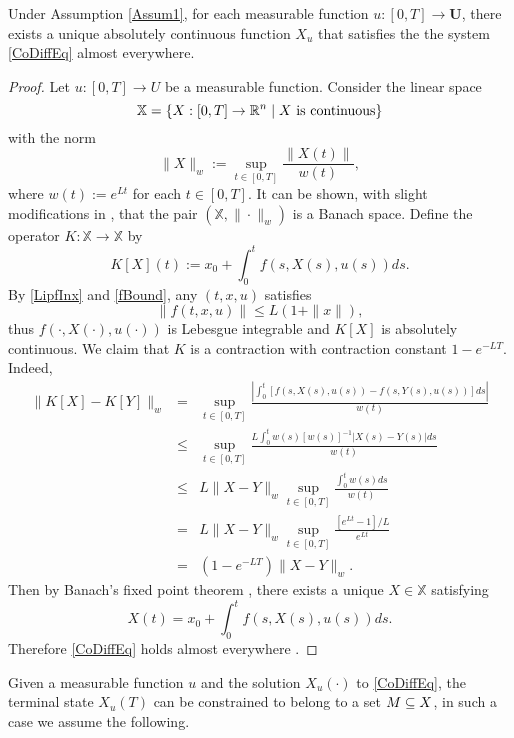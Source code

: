 \begin{theorem}\label{ExAdmisPair} 
	Under Assumption \ref{Assum1}, for each measurable function 
	$u:[0,T]\to \mathbf{U}$, there exists a unique absolutely continuous function $X_u$ that satisfies the the system 
	\eqref{CoDiffEq} almost everywhere. %
\end{theorem}
\begin{proof} Let $u:[0,T]\to U$ be a measurable function. Consider the linear space 
    \[\mathbb{X}=\{X:[0,T]\to \mathbb{R}^n\mid X \mbox{ is continuous}\}\] 
with the norm
    \[ \|X\|_w:=\sup_{t\in[0,T]} \frac{\|X(t)\|}{w(t)}, \]
where $w(t):=e^{Lt}$ for each $t\in [0,T]$. It can be shown, with slight modifications in \cite[Section 2.1]{Teschl}, that the pair $(\mathbb{X},\|\cdot\|_w)$ is a Banach space. Define the operator $K:\mathbb{X}\to \mathbb{X}$ by 
    \[ K[X](t):=x_0 + \int_0^t f(s,X(s),u(s))ds.\]
By \eqref{LipfInx} and \eqref{fBound}, any $(t,x,u)$ satisfies 
  \begin{equation}
      \|f(t,x,u)\| \leq  L(1+\|x\|),
  \end{equation}
thus $f(\cdot,X(\cdot),u(\cdot))$ is Lebesgue integrable and $K[X]$ is absolutely continuous. We claim that $K$ is a contraction with contraction constant $1-e^{-LT}$. Indeed,
    \begin{eqnarray*}
    \| K[X] - K[Y] \|_w & = & \sup_{t\in[0,T]} \frac{|\int_0^t [f(s,X(s),u(s)) -f(s,Y(s),u(s))]ds|}{w(t)}\\
        & \leq &   \sup_{t\in[0,T]} \frac{L\int_0^t w(s)[w(s)]^{-1}|X(s) -Y(s)|ds}{w(t)}\\
        &\leq &  L\|X-Y\|_w \sup_{t\in[0,T]} \frac{\int_0^t w(s)ds}{w(t)}\\
        & = &  L\|X-Y\|_w \sup_{t\in[0,T]}\frac{[e^{Lt}-1]/L}{e^{Lt}}\\
        & = &  (1-e^{-LT})\|X-Y\|_w. 
    \end{eqnarray*}
Then by Banach's fixed point theorem \cite[Theorem 2.1]{Teschl}, there exists a unique $X\in \mathbb{X}$ satisfying 
    \[ X(t)=x_0 + \int_0^t f(s,X(s),u(s))ds.\]
Therefore \eqref{CoDiffEq} holds almost everywhere \cite[Corollary 5.4.1]{Loeb2016}.
\end{proof}


	Given a measurable function $u$ and the solution $X_u(\cdot)$ to 
\eqref{CoDiffEq}, the terminal state $X_u(T)$ can be constrained to belong to a set $M\subseteq X$, in such a case we assume the following. 

